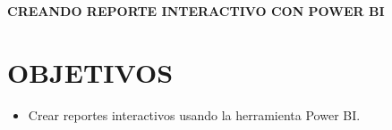 \documentclass[12pt,letterpaper]{article}
\begin{document}
    \newpage
    \begin{LARGE}
        \begin{center}
            \textbf{CREANDO REPORTE INTERACTIVO CON POWER BI}\\
        \end{center}
    \end{LARGE}
    \section{OBJETIVOS}
    \begin{itemize}
        \item Crear reportes interactivos usando la herramienta Power BI.
    \end{itemize}
\end{document}
